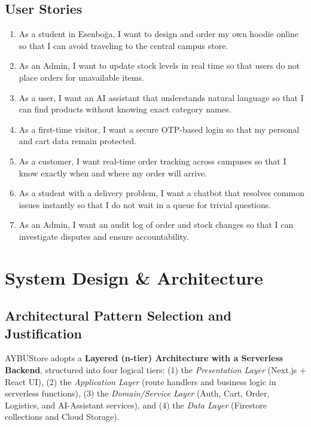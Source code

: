 \documentclass[11pt,a4paper]{article}
\begin{document}
\subsection{User Stories}
\begin{enumerate}
    \item As a student in Esenboğa, I want to design and order my own hoodie online so that I can avoid traveling to the central campus store.
    \item As an Admin, I want to update stock levels in real time so that users do not place orders for unavailable items.
    \item As a user, I want an AI assistant that understands natural language so that I can find products without knowing exact category names.
    \item As a first-time visitor, I want a secure OTP-based login so that my personal and cart data remain protected.
    \item As a customer, I want real-time order tracking across campuses so that I know exactly when and where my order will arrive.
    \item As a student with a delivery problem, I want a chatbot that resolves common issues instantly so that I do not wait in a queue for trivial questions.
    \item As an Admin, I want an audit log of order and stock changes so that I can investigate disputes and ensure accountability.
\end{enumerate}

\section{System Design \& Architecture}
\label{sec:system-design}

\subsection{Architectural Pattern Selection and Justification}
AYBUStore adopts a \textbf{Layered (n-tier) Architecture with a Serverless Backend}, structured into four logical tiers: (1) the \textit{Presentation Layer} (Next.js + React UI), (2) the \textit{Application Layer} (route handlers and business logic in serverless functions), (3) the \textit{Domain/Service Layer} (Auth, Cart, Order, Logistics, and AI-Assistant services), and (4) the \textit{Data Layer} (Firestore collections and Cloud Storage).
\end{document}
